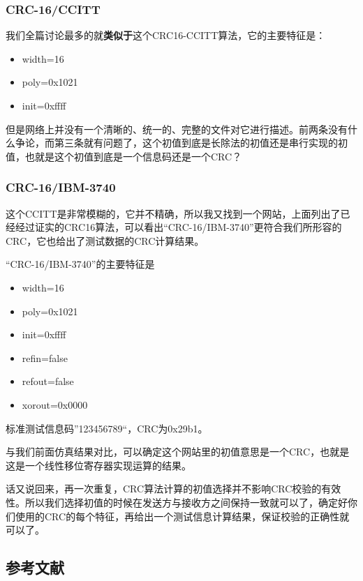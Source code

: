 \documentclass[
]{article}
\begin{document}
\hypertarget{header-n293}{%
\subsubsection{CRC-16/CCITT}\label{header-n293}}

我们全篇讨论最多的就\textbf{类似于}这个CRC16-CCITT算法，它的主要特征是：

\begin{itemize}
\item
  width=16
\item
  poly=0x1021
\item
  init=0xffff
\end{itemize}

但是网络上并没有一个清晰的、统一的、完整的文件对它进行描述。前两条没有什么争论，而第三条就有问题了，这个初值到底是长除法的初值还是串行实现的初值，也就是这个初值到底是一个信息码还是一个CRC？

\hypertarget{header-n303}{%
\subsubsection{CRC-16/IBM-3740}\label{header-n303}}

这个CCITT是非常模糊的，它并不精确，所以我又找到一个网站，上面列出了已经经过证实的CRC16算法，可以看出``CRC-16/IBM-3740''更符合我们所形容的CRC，它也给出了测试数据的CRC计算结果。

``CRC-16/IBM-3740''的主要特征是

\begin{itemize}
\item
  width=16
\item
  poly=0x1021
\item
  init=0xffff
\item
  refin=false
\item
  refout=false
\item
  xorout=0x0000
\end{itemize}

标准测试信息码''123456789``，CRC为0x29b1。

与我们前面仿真结果对比，可以确定这个网站里的初值意思是一个CRC，也就是这是一个线性移位寄存器实现运算的结果。

话又说回来，再一次重复，CRC算法计算的初值选择并不影响CRC校验的有效性。所以我们选择初值的时候在发送方与接收方之间保持一致就可以了，确定好你们使用的CRC的每个特征，再给出一个测试信息计算结果，保证校验的正确性就可以了。

\newpage
\hypertarget{header-n322}{%
\subsection{参考文献}\label{header-n322}}
\end{document}
